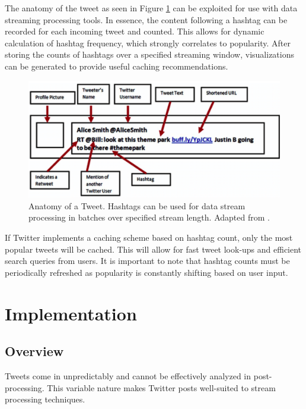 \documentclass[conference]{IEEEtran}
\begin{document}
The anatomy of the tweet as seen in Figure \ref{fig:tweet_anatomy} can be exploited for use with data streaming processing tools. In essence, the content following a hashtag can be recorded for each incoming tweet and counted. This allows for dynamic calculation of hashtag frequency, which strongly correlates to popularity. After storing the counts of hashtags over a specified streaming window, visualizations can be generated to provide useful caching recommendations. \par

\begin{figure}
    \centering
    \includegraphics[scale=0.5]{img/tweet_anatomy.PNG}
    \caption{Anatomy of a Tweet. Hashtags can be used for data stream processing in batches over specified stream length. Adapted from \cite{tweet_anatomy_figure}.}
    \label{fig:tweet_anatomy}
\end{figure}

If Twitter implements a caching scheme based on hashtag count, only the most popular tweets will be cached. This will allow for fast tweet look-ups and efficient search queries from users. It is important to note that hashtag counts must be periodically refreshed as popularity is constantly shifting based on user input. \par

\section{Implementation}

\subsection{Overview}
Tweets come in unpredictably and cannot be effectively analyzed in post-processing. This variable nature makes Twitter posts well-suited to stream processing techniques. \par
\end{document}
